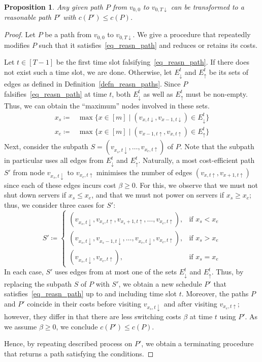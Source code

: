 \documentclass[hidelinks]{article}
\theoremstyle{plain}
\newtheorem{prop}[thm]{Proposition}
\theoremstyle{definition}
\theoremstyle{rem}
\newcommand{\costs}{c}
\begin{document}
\begin{prop}\label{prop_path_to_reasn_path}
Any given path $P$ from $v_{0,0}$ to $v_{0,T\downarrow}$ can be transformed to a reasonable path $P'$ with $\costs(P')\le\costs(P)$.
\end{prop}
\begin{proof}
Let $P$ be a path from $v_{0,0}$ to $v_{0,T\downarrow}$. We give a procedure that repeatedly modifies $P$ such that it satisfies~\eqref{eq_reasn_path} and reduces or retains its costs. 

Let $t\in[T-1]$ be the first time slot falsifying~\eqref{eq_reasn_path}. If there does not exist such a time slot, we are done. Otherwise, let $E_\downarrow^t$ and $E_\uparrow^t$ be its sets of edges as defined in Definition~\ref{defn_reasn_paths}. Since $P$ falsifies~\eqref{eq_reasn_path} at time $t$, both $E_\downarrow^t$ as well as $E_\uparrow^t$ must be non-empty. Thus, we can obtain the ``maximum'' nodes involved in these sets.
\begin{align*}
	x_s\coloneqq&\max\bigl\{x\in[m]\mid (v_{x,t\downarrow},v_{x-1,t\downarrow})\in E_\downarrow^t\bigr\}\\
	x_e\coloneqq&\max\bigl\{x\in[m]\mid (v_{x-1,t\uparrow},v_{x,t\uparrow})\in E_\uparrow^t\bigr\}
\end{align*}
Next, consider the subpath $S=(v_{x_s,t\downarrow},\ldots,v_{x_e,t\uparrow})$ of $P$. Note that the subpath in particular uses all edges from $E_\downarrow^t$ and $E_\uparrow^t$.
Naturally, a most cost-efficient path $S'$ from node $v_{x_s,t\downarrow}$ to $v_{x_e,t\uparrow}$ minimises the number of edges $(v_{x,t\uparrow},v_{x+1,t\uparrow})$ since each of these edges incurs cost $\beta\ge 0$. For this, we observe that we must not shut down servers if $x_s\le x_e$, and that we must not power on servers if $x_s\ge x_e$; thus, we consider three cases for $S'$:
\begin{equation*}
	S'\coloneqq
	\begin{cases}
		(v_{x_s,t\downarrow},v_{x_s,t\uparrow},v_{x_s+1,t\uparrow},\ldots,v_{x_e,t\uparrow}), & \text{if $x_s< x_e$}\\
		(v_{x_s,t\downarrow},v_{x_s-1,t\downarrow},\ldots,v_{x_e,t\downarrow},v_{x_e,t\uparrow}), & \text{if $x_s>x_e$}\\
		(v_{x_s,t\downarrow},v_{x_e,t\uparrow}), & \text{if $x_s=x_e$}
	\end{cases}
\end{equation*}
In each case, $S'$ uses edges from at most one of the sets $E_\downarrow^t$ and $E_\uparrow^t$. Thus, by replacing the subpath $S$ of $P$ with $S'$, we obtain a new schedule $P'$ that satisfies~\eqref{eq_reasn_path} up to and including time slot $t$. Moreover, the paths $P$ and $P'$ coincide in their costs before visiting $v_{x_s,t\downarrow}$ and after visiting $v_{x_e,t\uparrow}$; however, they differ in that there are less switching costs $\beta$ at time $t$ using $P'$. As we assume $\beta\ge0$, we conclude $\costs(P')\le \costs(P)$.

Hence, by repeating described process on $P'$, we obtain a terminating procedure that returns a path satisfying the conditions.
\end{proof}
\end{document}
